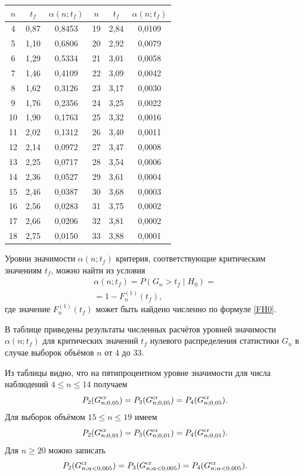 \begin{table}
\small
\centering
\begin{tabular}{ccc|ccc}
\hline
\footnotesize $n$&
\footnotesize $t_f$&
\footnotesize $\alpha(n;t_f)$&
\footnotesize $n$&
\footnotesize $t_f$&
\footnotesize$\alpha(n;t_f)$\\
\hline
\rule{0mm}{12pt}%
4&	0,87&	0,8453& 19&	2,84&	0,0109\\
5&	1,10&	0,6806& 20&	2,92&	0,0079\\
6&	1,29&	0,5334& 21&	3,01&	0,0058\\
7&	1,46&	0,4109& 22&	3,09&	0,0042\\
8&	1,62&	0,3126& 23&	3,17&	0,0030\\
9&	1,76&	0,2356& 24&	3,25&	0,0022\\
10&	1,90&	0,1763& 25&	3,32&	0,0016\\
11&	2,02&	0,1312& 26&	3,40&	0,0011\\
12&	2,14&	0,0972& 27&	3,47&	0,0008\\
13&	2,25&	0,0717& 28&	3,54&	0,0006\\
14&	2,36&	0,0527& 29&	3,61&	0,0004\\
15&	2,46&	0,0387& 30&	3,68&	0,0003\\
16&2,56&	0,0283& 31&	3,75&	0,0002\\
17&	2,66&	0,0206& 32&	3,81&	0,0002\\
18&	2,75&	0,0150& 33&	3,88&	0,0001\\
\hline
\end{tabular}

\end{table}

\noindent
Уровни значимости $\alpha(n;t_f)$ критерия, соответствующие критическим значениям $t_f$, можно найти из условия
\begin{multline}
 \alpha(n;t_f)=P\left(G_{n}> t_f \mid H_0 \right)=\\ =1-F_{n}^{(1)}(t_f),
\end{multline}
где значение $F_{n}^{(1)}(t_f)$ может быть найдено численно по формуле \eqref{FH0}. 

В таблице  приведены результаты численных расчётов уровней значимости $\alpha(n;t_f)$ для критических значений ${t_f}$  нулевого распределения статистики ${G_{n}}$ в случае выборок объёмов $n$ от 4 до 33.



Из таблицы видно, что на пятипроцентном уровне значимости для числа наблюдений $4\le n\le 14$ получаем
$$
P_2(G_{n;0,05}^{\rm cr})=P_3(G_{n;0,05}^{\rm cr})=P_4(G_{n;0,05}^{\rm cr}).
$$
Для выборок объёмом $15\le n\le 19$ имеем
$$
P_2(G_{n;0,01}^{\rm cr})=P_3(G_{n;0,01}^{\rm cr})=P_4(G_{n;0,01}^{\rm cr}).
$$
Для $n\ge 20$ можно записать
$$
P_2(G_{n;\alpha<0,005}^{\rm cr})=P_3(G_{n;\alpha<0,005}^{\rm cr})=P_4(G_{n;\alpha<0,005}^{\rm cr}).
$$

